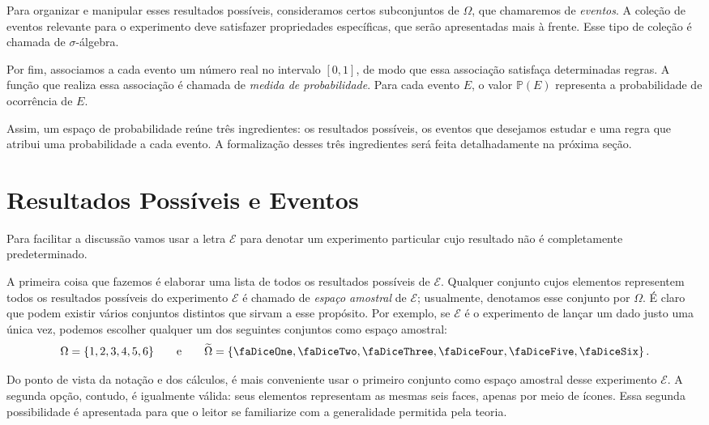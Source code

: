 \documentclass[12pt,portuguese]{article}
\theoremstyle{definition}
\begin{document}
Para organizar e manipular esses resultados possíveis, consideramos certos
subconjuntos de $\Omega$, que chamaremos de \emph{eventos}. A coleção de
eventos relevante para o experimento deve satisfazer propriedades específicas,
que serão apresentadas mais à frente. Esse tipo de coleção é chamada de
$\sigma$-álgebra.

Por fim, associamos a cada evento um número real no intervalo $[0,1]$, de modo
que essa associação satisfaça determinadas regras. A função que realiza essa
associação é chamada de \emph{medida de probabilidade}. Para cada evento $E$, o
valor $\mathbb{P}(E)$ representa a probabilidade de ocorrência de $E$.

Assim, um espaço de probabilidade reúne três ingredientes: os resultados
possíveis, os eventos que desejamos estudar e uma regra que atribui uma
probabilidade a cada evento. A formalização desses três ingredientes 
será feita detalhadamente na próxima seção.



\section{Resultados Possíveis e Eventos}

Para facilitar a discussão vamos usar a letra \(\mathcal{E}\) 
para denotar um experimento particular cujo
resultado não é completamente predeterminado. 

A primeira coisa que fazemos é
elaborar uma lista de todos os resultados possíveis de \(\mathcal{E}\).
Qualquer conjunto cujos elementos representem todos os resultados possíveis do
experimento \(\mathcal{E}\) é chamado de \emph{espaço amostral} de \(\mathcal{E}\);
usualmente, denotamos esse conjunto por \(\Omega\). É claro que podem existir
vários conjuntos distintos que sirvam a esse propósito.
Por exemplo, se \(\mathcal{E}\) é o experimento de lançar um dado justo uma
única vez, podemos escolher qualquer um dos seguintes conjuntos como espaço
amostral:
\[
\Omega = \{1, 2, 3, 4, 5, 6\}
\qquad
\text{e}
\qquad
\widetilde{\Omega} =
\left\{
\text{\faDiceOne}, \text{\faDiceTwo}, \text{\faDiceThree},
\text{\faDiceFour}, \text{\faDiceFive}, \text{\faDiceSix}
\right\}.
\]

Do ponto de vista da notação e dos cálculos, é mais conveniente usar o primeiro
conjunto como espaço amostral desse experimento \(\mathcal{E}\). A segunda opção,
contudo, é igualmente válida: seus elementos representam as mesmas seis faces,
apenas por meio de ícones. Essa segunda possibilidade é apresentada para que o
leitor se familiarize com a generalidade permitida pela teoria.
\end{document}
